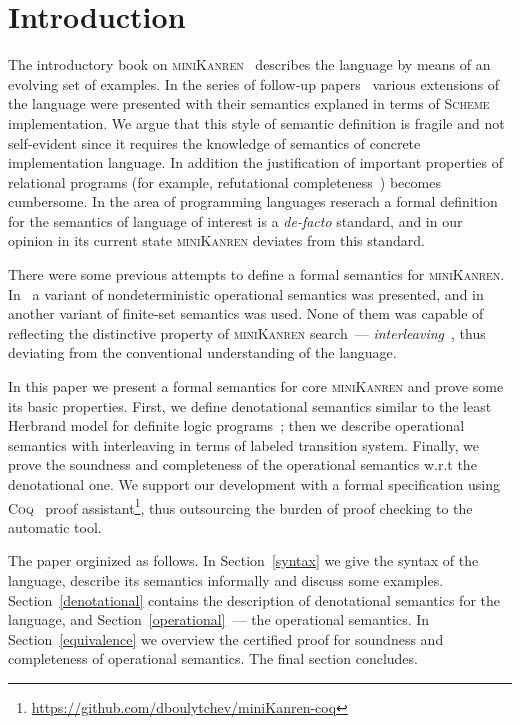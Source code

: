 \section{Introduction}

The introductory book on \textsc{miniKanren}~\cite{TRS} describes the language by means of an evolving set of examples. In the
series of follow-up papers~\cite{MicroKanren,CKanren,CKanren1,AlphaKanren,2016,Guided} various extensions of the language were presented with
their semantics explaned in terms of \textsc{Scheme} implementation. We argue that this style of semantic definition is
fragile and not self-evident since it requires the knowledge of semantics of concrete implementation language. In addition the justification of
important properties of relational programs (for example, refutational completeness~\cite{WillThesis}) becomes cumbersome. In the
area of programming languages reserach a formal definition for the semantics of language of interest is a \emph{de-facto} standard, and
in our opinion in its current state \textsc{miniKanren} deviates from this standard.

There were some previous attempts to define a formal semantics for \textsc{miniKanren}. In~\cite{RelConversion} a variant of nondeterministic
operational semantics was presented, and in~\cite{DivTest} another variant of finite-set semantics was used. None of them was capable of reflecting
the distinctive property of \textsc{miniKanren} search~--- \emph{interleaving}~\cite{Search}, thus deviating from the conventional understanding
of the language.

In this paper we present a formal semantics for core \textsc{miniKanren} and prove some its basic properties. First,
we define denotational semantics similar to the least Herbrand model for definite logic programs~\cite{LHM}; then
we describe operational semantics with interleaving in terms of labeled transition system. Finally, we prove the soundness and
completeness of the operational semantics w.r.t the denotational one. We support our development with a formal specification
using \textsc{Coq}~\cite{Coq} proof assistant\footnote{\url{https://github.com/dboulytchev/miniKanren-coq}}, thus outsourcing
the burden of proof checking to the automatic tool. 

The paper orginized as follows. In Section~\ref{syntax} we give the syntax of the language, describe its semantics
informally and discuss some examples. Section~\ref{denotational} contains the description of denotational semantics for
the language, and Section~\ref{operational}~--- the operational semantics. In Section~\ref{equivalence} we overview the
certified proof for soundness and completeness of operational semantics. The final section concludes.


